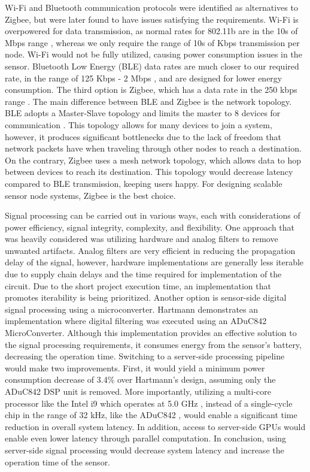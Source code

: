 \documentclass{article}
\begin{document}
Wi-Fi and Bluetooth communication protocols were identified as alternatives to Zigbee, but were later found to have issues satisfying the requirements. Wi-Fi is overpowered for data transmission, as normal rates for 802.11b are in the 10s of Mbps range \cite{cisco}, whereas we only require the range of 10s of Kbps transmission per node. Wi-Fi would not be fully utilized, causing power consumption issues in the sensor. Bluetooth Low Energy (BLE) data rates are much closer to our required rate, in the range of 125 Kbps - 2 Mbps \cite{nordic}, and are designed for lower energy consumption. The third option is Zigbee, which has a data rate in the 250 kbps range \cite{ehub}. The main difference between BLE and Zigbee is the network topology. BLE adopts a Master-Slave topology and limits the master to 8 devices for communication \cite{ehub}. This topology allows for many devices to join a system, however, it produces significant bottlenecks due to the lack of freedom that network packets have when traveling through other nodes to reach a destination. On the contrary, Zigbee uses a mesh network topology, which allows data to hop between devices to reach its destination. This topology would decrease latency compared to BLE transmission, keeping users happy. For designing scalable sensor node systems, Zigbee is the best choice.

Signal processing can be carried out in various ways, each with considerations of power efficiency, signal integrity, complexity, and flexibility. One approach that was heavily considered was utilizing hardware and analog filters to remove unwanted artifacts. Analog filters are very efficient in reducing the propagation delay of the signal, however, hardware implementations are generally less iterable due to supply chain delays and the time required for implementation of the circuit. Due to the short project execution time, an implementation that promotes iterability is being prioritized. Another option is sensor-side digital signal processing using a microconverter. Hartmann \cite{analogfilter} demonstrates an implementation where digital filtering was executed using an ADuC842 MicroConverter. Although this implementation provides an effective solution to the signal processing requirements, it consumes energy from the sensor's battery, decreasing the operation time. Switching to a server-side processing pipeline would make two improvements. First, it would yield a minimum power consumption decrease of 3.4\% over Hartmann's design, assuming only the ADuC842 DSP unit is removed. More importantly, utilizing a multi-core processor like the Intel i9 which operates at 5.0 GHz \cite{msi}, instead of a single-cycle chip in the range of 32 kHz, like the ADuC842 \cite{ADUC842}, would enable a significant time reduction in overall system latency. In addition, access to server-side GPUs would enable even lower latency through parallel computation. In conclusion, using server-side signal processing would decrease system latency and increase the operation time of the sensor.
\end{document}
